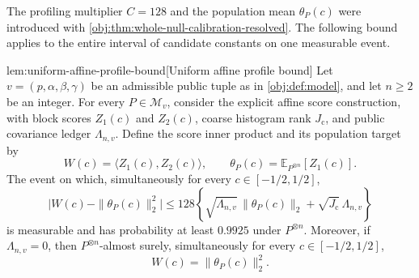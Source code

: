 \documentclass[11pt]{article}
\begin{document}
The profiling multiplier \(C=128\) and the population mean \(\theta_P(c)\) were introduced with \cref{obj:thm:whole-null-calibration-resolved}. The following bound applies to the entire interval of candidate constants on one measurable event.

\begin{lemmav}{lem:uniform-affine-profile-bound}[Uniform affine profile bound]
Let \(v=(p,\alpha,\beta,\gamma)\) be an admissible public tuple as in \cref{obj:def:model}, and let \(n\ge 2\) be an integer. For every \(P\in\mathcal M_v\), consider the explicit affine score construction, with block scores \(Z_1(c)\) and \(Z_2(c)\), coarse histogram rank \(J_{\mathrm c}\), and public covariance ledger \(\Lambda_{n,v}\). Define the score inner product and its population target by
\[
W(c)=\langle Z_1(c),Z_2(c)\rangle,
\qquad
\theta_P(c)=\mathbb E_{P^{\otimes n}}[Z_1(c)].
\]
The event on which, simultaneously for every \(c\in[-1/2,1/2]\),
\[
\bigl|W(c)-\|\theta_P(c)\|_2^2\bigr|
\le
128\left\{
\sqrt{\Lambda_{n,v}}\,\|\theta_P(c)\|_2
+\sqrt{J_{\mathrm c}}\,\Lambda_{n,v}
\right\}
\]
is measurable and has probability at least \(0.9925\) under \(P^{\otimes n}\). Moreover, if \(\Lambda_{n,v}=0\), then \(P^{\otimes n}\)-almost surely, simultaneously for every \(c\in[-1/2,1/2]\),
\[
W(c)=\|\theta_P(c)\|_2^2.
\]
\end{lemmav}
\end{document}
